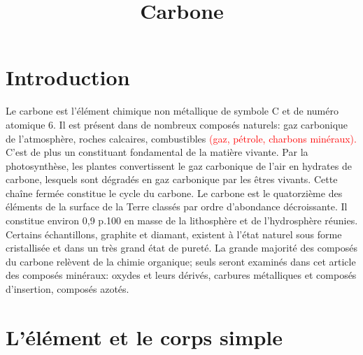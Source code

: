 \documentclass[a4 paper, 10 pt]{article}
\title{Carbone}
\date {}
\begin{document}
	





\maketitle
\tableofcontents

\section{Introduction}  

Le carbone est l'élément chimique non métallique de symbole C et de numéro atomique 6. Il est présent dans de nombreux composés naturels: gaz carbonique de l'atmosphère, roches calcaires, combustibles \textcolor{red}{(gaz, pétrole, charbons minéraux).}  C'est de plus un constituant fondamental de la matière vivante. Par la photosynthèse, les plantes convertissent le gaz carbonique de l'air en hydrates de carbone, lesquels sont dégradés en gaz carbonique par les êtres vivants. Cette chaîne fermée constitue le cycle du carbone.  Le carbone est le quatorzième des éléments de la
surface de la Terre classés par ordre d'abondance décroissante. Il constitue environ 0,9 p.100 en masse de la
lithosphère et de l'hydrosphère réunies. Certains échantillons, graphite et diamant, existent à l'état naturel
sous forme cristallisée et dans un très grand état de pureté. La grande majorité des composés du carbone
relèvent de la chimie organique; seuls seront examinés dans cet article des composés minéraux: oxydes et leurs dérivés,
carbures métalliques et composés d'insertion, composés azotés. 

\section{L'élément et le corps simple} 
\end{document}
